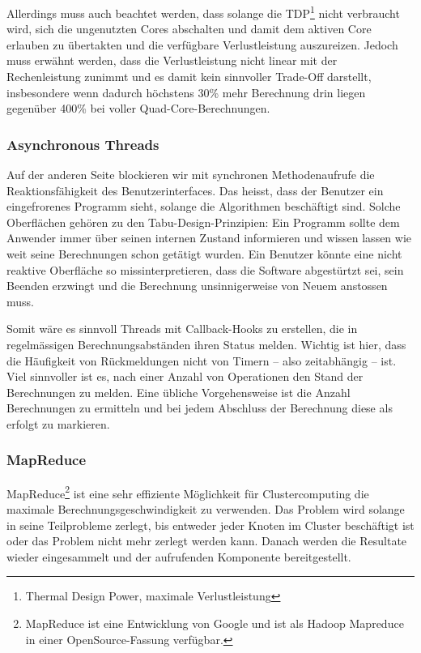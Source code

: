 Allerdings muss auch beachtet werden, dass solange die TDP\footnote{Thermal
Design Power, maximale Verlustleistung} nicht verbraucht wird, sich die
ungenutzten Cores abschalten und damit dem aktiven Core erlauben zu übertakten
und die verfügbare Verlustleistung auszureizen.  Jedoch muss erwähnt werden,
dass die Verlustleistung nicht linear mit der Rechenleistung zunimmt und es
damit kein sinnvoller Trade-Off darstellt, insbesondere wenn dadurch höchstens
30\% mehr Berechnung drin liegen gegenüber 400\% bei voller
Quad-Core-Berechnungen.

\subsubsection{Asynchronous Threads}
Auf der anderen Seite blockieren wir mit synchronen Methodenaufrufe die
Reaktionsfähigkeit des Benutzerinterfaces. Das heisst, dass der Benutzer ein
eingefrorenes Programm sieht, solange die Algorithmen beschäftigt sind. Solche
Oberflächen gehören zu den Tabu-Design-Prinzipien: Ein Programm sollte dem
Anwender immer über seinen internen Zustand informieren und wissen lassen wie
weit seine Berechnungen schon getätigt wurden. Ein Benutzer könnte eine nicht
reaktive Oberfläche so missinterpretieren, dass die Software abgestürtzt sei,
sein Beenden erzwingt und die Berechnung unsinnigerweise von Neuem anstossen
muss.

Somit wäre es sinnvoll Threads mit Callback-Hooks zu erstellen, die in
regelmässigen Berechnungsabständen ihren Status melden. Wichtig ist hier, dass
die Häufigkeit von Rückmeldungen nicht von Timern -- also zeitabhängig -- ist. Viel
sinnvoller ist es, nach einer Anzahl von Operationen den Stand der
Berechnungen zu melden. Eine übliche Vorgehensweise ist die Anzahl
Berechnungen zu ermitteln und bei jedem Abschluss der Berechnung diese als
erfolgt zu markieren.

\subsubsection{MapReduce}
MapReduce\footnote{MapReduce ist eine Entwicklung von Google und ist als
Hadoop Mapreduce in einer OpenSource-Fassung verfügbar.} ist eine sehr
effiziente Möglichkeit für Clustercomputing die maximale
Berechnungsgeschwindigkeit zu verwenden. Das Problem wird solange in seine
Teilprobleme zerlegt, bis entweder jeder Knoten im Cluster beschäftigt ist
oder das Problem nicht mehr zerlegt werden kann. Danach werden die Resultate
wieder eingesammelt und der aufrufenden Komponente
bereitgestellt.\cite{Google:MapReduce}

